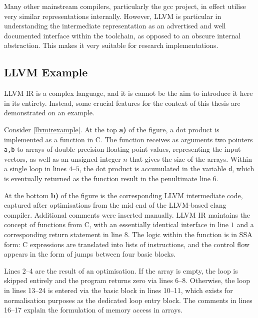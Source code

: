     Many other mainstream compilers, particularly the gcc project, in effect
    utilise very similar representations internally.
    However, LLVM is particular in understanding the intermediate
    representation as an advertised and well documented interface within the
    toolchain, as opposed to an obscure internal abstraction.
    This makes it very suitable for research implementations.

\subsection{LLVM Example}

    LLVM IR is a complex language, and it is cannot be the aim to introduce it
    here in its entirety.
    Instead, some crucial features for the context of this thesis are
    demonstrated on an example.

    Consider \autoref{llvmirexample}.
    At the top {\bf a)} of the figure, a dot product is implemented as a
    function in C.
    The function receives as arguments two pointers {\tt a,b} to arrays of
    double precision floating point values, representing the input vectors, as
    well as an unsigned integer $n$ that gives the size of the arrays.
    Within a single loop in lines $4$--$5$, the dot product is accumulated in
    the variable {\tt d}, which is eventually returned as the function result in
    the penultimate line $6$.

    At the bottom {\bf b)} of the figure is the corresponding LLVM intermediate
    code, captured after optimisations from the mid end of the LLVM-based clang
    compiler.
    Additional comments were inserted manually.
    LLVM IR maintains the concept of functions from C, with an essentially
    identical interface in line $1$ and a corresponding return statement in
    line $8$.
    The logic within the function is in SSA form: C expressions are translated
    into lists of instructions, and the control flow appears in the form of
    jumps between four basic blocks.

    Lines 2--4 are the result of an optimisation.
    If the array is empty, the loop is skipped entirely and the program returns
    zero via lines 6--8.
    Otherwise, the loop in lines 13--24 is entered via the basic block in lines
    10--11, which exists for normalisation purposes as the dedicated loop entry
    block.
    The comments in lines 16--17 explain the formulation of memory access in
    arrays.


